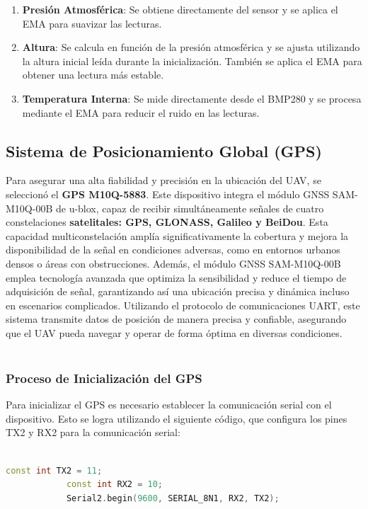     \begin{enumerate}
        \item \textbf{Presión Atmosférica}: Se obtiene directamente del sensor y se aplica el EMA para suavizar las lecturas.
        \item \textbf{Altura}: Se calcula en función de la presión atmosférica y se ajusta utilizando la altura inicial leída durante la inicialización. También se aplica el EMA para obtener una lectura más estable.
        \item \textbf{Temperatura Interna}: Se mide directamente desde el BMP280 y se procesa mediante el EMA para reducir el ruido en las lecturas.
    \end{enumerate}



\subsection{Sistema de Posicionamiento Global (GPS)}

    Para asegurar una alta fiabilidad y precisión en la ubicación del UAV, se seleccionó el \textbf{GPS M10Q-5883}. Este dispositivo integra el módulo GNSS SAM-M10Q-00B de u-blox, capaz de recibir simultáneamente señales de cuatro constelaciones \textbf{satelitales: GPS, GLONASS, Galileo y BeiDou}.\cite{GPS} Esta capacidad multiconstelación amplía significativamente la cobertura y mejora la disponibilidad de la señal en condiciones adversas, como en entornos urbanos densos o áreas con obstrucciones. Además, el módulo GNSS SAM-M10Q-00B emplea tecnología avanzada que optimiza la sensibilidad y reduce el tiempo de adquisición de señal, garantizando así una ubicación precisa y dinámica incluso en escenarios complicados. Utilizando el protocolo de comunicaciones UART, este sistema transmite datos de posición de manera precisa y confiable, asegurando que el UAV pueda navegar y operar de forma óptima en diversas condiciones. \\ \\

    \subsubsection{Proceso de Inicialización del GPS}
        Para inicializar el GPS es necesario establecer la comunicación serial con el dispositivo. Esto se logra utilizando el siguiente código, que configura los pines TX2 y RX2 para la comunicación serial: \\ \\
        \begin{lstlisting}[language=C++]
            const int TX2 = 11;
            const int RX2 = 10;
            Serial2.begin(9600, SERIAL_8N1, RX2, TX2);
        \end{lstlisting}

